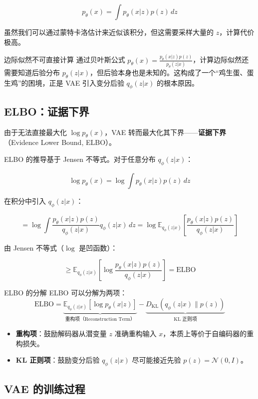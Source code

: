 \documentclass[a4paper]{article}
\begin{document}
$$p_\theta(x) = \int p_\theta(x|z) p(z) \, dz$$

虽然我们可以通过蒙特卡洛估计来近似该积分，但这需要采样大量的 $z$，计算代价极高。

\begin{warningbox}{边际似然不可直接计算}
通过贝叶斯公式 $p_\theta(x) = \frac{p_\theta(x|z) p(z)}{p_\theta(z|x)}$，计算边际似然还需要知道后验分布 $p_\theta(z|x)$，但后验本身也是未知的。这构成了一个``鸡生蛋、蛋生鸡''的困境，正是 VAE 引入变分后验 $q_\phi(z|x)$ 的根本原因。
\end{warningbox}

\subsection{ELBO：证据下界}

由于无法直接最大化 $\log p_\theta(x)$，VAE 转而最大化其下界——\textbf{证据下界}（Evidence Lower Bound, ELBO）。

ELBO 的推导基于 Jensen 不等式。对于任意分布 $q_\phi(z|x)$：

$$\log p_\theta(x) = \log \int p_\theta(x|z) p(z) \, dz$$

在积分中引入 $q_\phi(z|x)$：

$$= \log \int \frac{p_\theta(x|z) p(z)}{q_\phi(z|x)} q_\phi(z|x) \, dz = \log \mathbb{E}_{q_\phi(z|x)} \left[ \frac{p_\theta(x|z) p(z)}{q_\phi(z|x)} \right]$$

由 Jensen 不等式（$\log$ 是凹函数）：

$$\geq \mathbb{E}_{q_\phi(z|x)} \left[ \log \frac{p_\theta(x|z) p(z)}{q_\phi(z|x)} \right] = \text{ELBO}$$

\begin{importantbox}{ELBO 的分解}
ELBO 可以分解为两项：
$$\text{ELBO} = \underbrace{\mathbb{E}_{q_\phi(z|x)}[\log p_\theta(x|z)]}_{\text{重构项（Reconstruction Term）}} - \underbrace{D_{\text{KL}}(q_\phi(z|x) \| p(z))}_{\text{KL 正则项}}$$

\begin{itemize}
    \item \textbf{重构项}：鼓励解码器从潜变量 $z$ 准确重构输入 $x$，本质上等价于自编码器的重构损失。
    \item \textbf{KL 正则项}：鼓励变分后验 $q_\phi(z|x)$ 尽可能接近先验 $p(z) = \mathcal{N}(0, I)$。
\end{itemize}
\end{importantbox}

\subsection{VAE 的训练过程}
\end{document}
